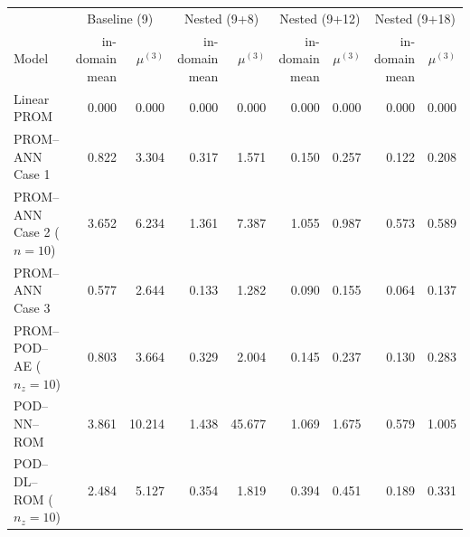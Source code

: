 \begin{tabular}{lrr|rr|rr|rr}
\toprule
& \multicolumn{2}{c|}{Baseline (9)} & \multicolumn{2}{c|}{Nested (9+8)} & \multicolumn{2}{c|}{Nested (9+12)} & \multicolumn{2}{c}{Nested (9+18)} \\
Model & \shortstack{in-domain\\mean} & $\mu^{(3)}$ & \shortstack{in-domain\\mean} & $\mu^{(3)}$ & \shortstack{in-domain\\mean} & $\mu^{(3)}$ & \shortstack{in-domain\\mean} & $\mu^{(3)}$ \\
\midrule
Linear PROM & 0.000 & 0.000 & 0.000 & 0.000 & 0.000 & 0.000 & 0.000 & 0.000 \\
PROM--ANN Case 1 & 0.822 & 3.304 & 0.317 & 1.571 & 0.150 & 0.257 & 0.122 & 0.208 \\
PROM--ANN Case 2 ($n=10$) & 3.652 & 6.234 & 1.361 & 7.387 & 1.055 & 0.987 & 0.573 & 0.589 \\
PROM--ANN Case 3 & 0.577 & 2.644 & 0.133 & 1.282 & 0.090 & 0.155 & 0.064 & 0.137 \\
PROM--POD--AE ($n_z=10$) & 0.803 & 3.664 & 0.329 & 2.004 & 0.145 & 0.237 & 0.130 & 0.283 \\
\midrule
POD--NN--ROM & 3.861 & 10.214 & 1.438 & 45.677 & 1.069 & 1.675 & 0.579 & 1.005 \\
POD--DL--ROM ($n_z=10$) & 2.484 & 5.127 & 0.354 & 1.819 & 0.394 & 0.451 & 0.189 & 0.331 \\
\bottomrule
\end{tabular}
